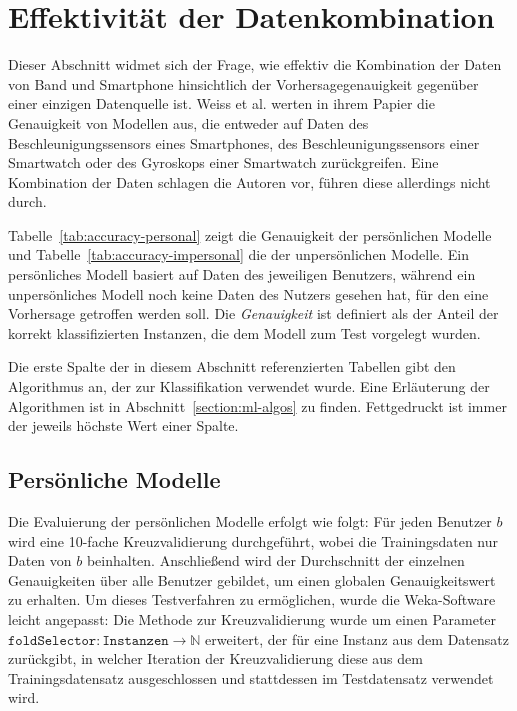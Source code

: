 \section{Effektivität der Datenkombination}
Dieser Abschnitt widmet sich der Frage, wie effektiv die Kombination der Daten von Band und Smartphone hinsichtlich der Vorhersagegenauigkeit gegenüber einer einzigen Datenquelle ist. Weiss et al.\cite{Weiss2016} werten in ihrem Papier die Genauigkeit von Modellen aus, die entweder auf Daten des Beschleunigungssensors eines Smartphones, des Beschleunigungssensors einer Smartwatch oder des Gyroskops einer Smartwatch zurückgreifen. Eine Kombination der Daten schlagen die Autoren vor, führen diese allerdings nicht durch.

Tabelle~\ref{tab:accuracy-personal} zeigt die Genauigkeit der persönlichen Modelle und Tabelle~\ref{tab:accuracy-impersonal} die der unpersönlichen Modelle. Ein persönliches Modell basiert auf Daten des jeweiligen Benutzers, während ein unpersönliches Modell noch keine Daten des Nutzers gesehen hat, für den eine Vorhersage getroffen werden soll. Die \textit{Genauigkeit} ist definiert als der Anteil der korrekt klassifizierten Instanzen, die dem Modell zum Test vorgelegt wurden.

Die erste Spalte der in diesem Abschnitt referenzierten Tabellen gibt den Algorithmus an, der zur Klassifikation verwendet wurde. Eine Erläuterung der Algorithmen ist in Abschnitt~\ref{section:ml-algos}
zu finden. Fettgedruckt ist immer der jeweils höchste Wert einer Spalte.

\subsection{Persönliche Modelle}

Die Evaluierung der persönlichen Modelle erfolgt wie folgt: Für jeden Benutzer $b$ wird eine 10-fache Kreuzvalidierung durchgeführt, wobei die Trainingsdaten nur Daten von $b$ beinhalten. Anschließend wird der Durchschnitt der einzelnen Genauigkeiten über alle Benutzer gebildet, um einen globalen Genauigkeitswert zu erhalten. Um dieses Testverfahren zu ermöglichen, wurde die Weka-Software leicht angepasst: Die Methode zur Kreuzvalidierung wurde um einen Parameter $\texttt{foldSelector}: \texttt{Instanzen} \to \mathbb{N}$ erweitert, der für eine Instanz aus dem Datensatz zurückgibt, in welcher Iteration der Kreuzvalidierung diese aus dem Trainingsdatensatz ausgeschlossen und stattdessen im Testdatensatz verwendet wird.

